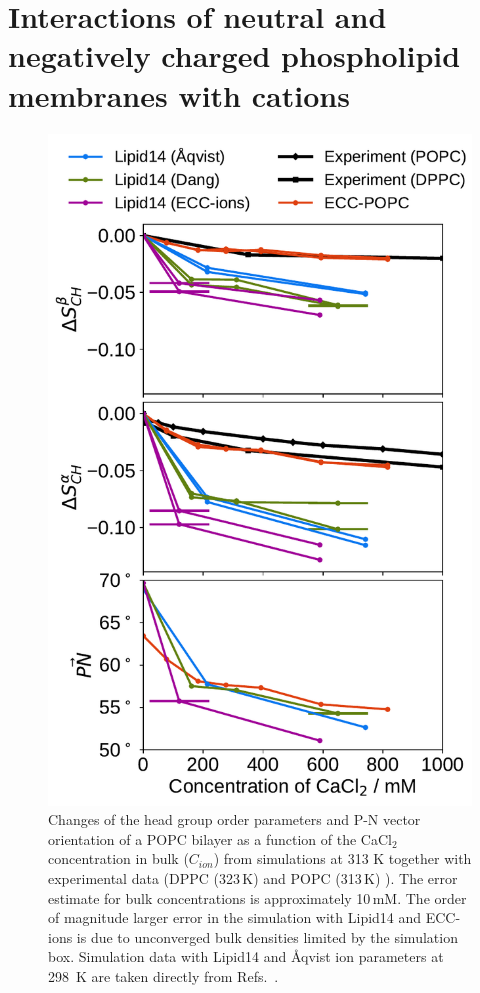 \section{Interactions of neutral and negatively charged phospholipid membranes with  cations}
\label{section:lip-ion_ca}



\begin{figure}[tbp!] 
  \centering 
  \includegraphics[width=\figwidth]{../img/ecc_popc/OrdPars-A-B-PNvec_L14-ECC-lipids_CaCl.pdf}
  \caption{\label{fig:delta_ordPar_CaCl} 
    Changes of the head group order parameters and P-N vector orientation of a POPC bilayer  
    as a function of the CaCl$_2$ concentration in bulk ($C_{ion}$) 
    from simulations at 313 K together with experimental data  
    (DPPC (323\,K) \citep{akutsu81} and POPC (313\,K) \citep{altenbach84}).  
    The error estimate for bulk concentrations is approximately 10\,mM. 
    The order of magnitude larger error in the
    simulation with Lipid14 and ECC-ions is due to unconverged bulk densities limited by the simulation box.  
    Simulation data with Lipid14 and Åqvist ion parameters at 298~K are taken directly from 
    Refs.~\citep{lipid14POPC0mMNaClfiles,lipid14POPC350mMCaClfiles,lipid14POPC350mMCaClfilesNC}. 
  } 
\end{figure} 


